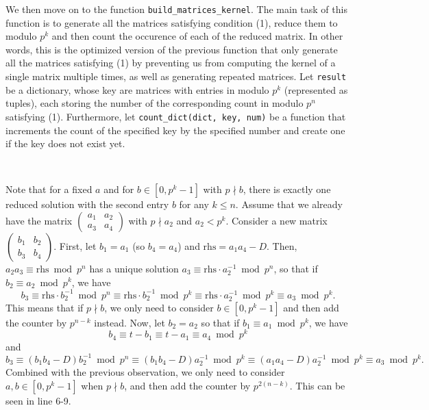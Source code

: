 \documentclass[letterpaper,12pt]{article}
\begin{document}
We then move on to the function 
\texttt{build\_matrices\_kernel}.
The main task of this function is to generate all the matrices 
satisfying condition (1), reduce them to modulo $p^k$
and then count the occurence of each of the reduced matrix.
In other words, this is the optimized version of the previous function 
that only generate all the matrices satisfying (1)
by preventing us from computing the kernel of a single matrix multiple times,
as well as generating repeated matrices.
Let \texttt{result} be a dictionary, whose key are
matrices with entries in modulo $p^k$ (represented as tuples),
each storing the number of the corresponding count in modulo $p^n$ satisfying (1).
Furthermore, let \texttt{count\_dict(dict, key, num)} be a function 
that increments the count of the specified key by the specified number 
and create one if the key does not exist yet.

\

Note that for a fixed $a$ and for $b \in [0, p^k-1]$ with $p \nmid b$,  
there is exactly one reduced solution with the second entry $b$ for any $k \leq n$. 
Assume that we already have the matrix $\begin{pmatrix}
a_1 & a_2 \\ a_3 & a_4
\end{pmatrix}$ with $p \nmid a_2$ and $a_2 < p^k$. Consider a new matrix 
$\begin{pmatrix}
b_1 & b_2 \\ b_3 & b_4
\end{pmatrix}$.
First, let $b_1 = a_1$ (so $b_4 = a_4$) and 
$\text{rhs} = a_1a_4-D$.
Then, $a_2a_3 \equiv \text{rhs} \bmod p^{n}$ has a unique solution 
$a_3 \equiv \text{rhs} \cdot a_2^{-1} \bmod p^{n}$,
so that if $b_2 \equiv a_2 \bmod p^k$, we have 
\vspace{0.1in}
\[
b_3 \equiv \text{rhs} \cdot b_2^{-1} \bmod p^{n}
\equiv \text{rhs} \cdot b_2^{-1} \bmod p^{k}
\equiv \text{rhs} \cdot a_2^{-1} \bmod p^k
\equiv a_3  \bmod p^k.
\]
\vspace{0.1in}
This means that if $p \nmid b$, we only need to consider $b \in [0, p^{k}-1]$
and then add the counter by $p^{n-k}$ instead.
Now, let $b_2 = a_2$ so that if $b_1 \equiv a_1 \bmod p^k$, we have
\[
b_4 \equiv t-b_1 \equiv t-a_1 \equiv a_4 \bmod p^k
\] 
and 
\[
b_3 \equiv (b_1b_4 - D)b_2^{-1} \bmod p^{n}
\equiv (b_1b_4 - D)a_2^{-1} \bmod p^k 
\equiv (a_1a_4 - D)a_2^{-1} \bmod p^k 
\equiv a_3 \bmod p^k.
\]
Combined with the previous observation, 
we only need to consider $a,b \in [0, p^{k}-1]$
when $p \nmid b$,
and then add the counter by $p^{2(n-k)}$. 
This can be seen in line 6-9.
\end{document}
